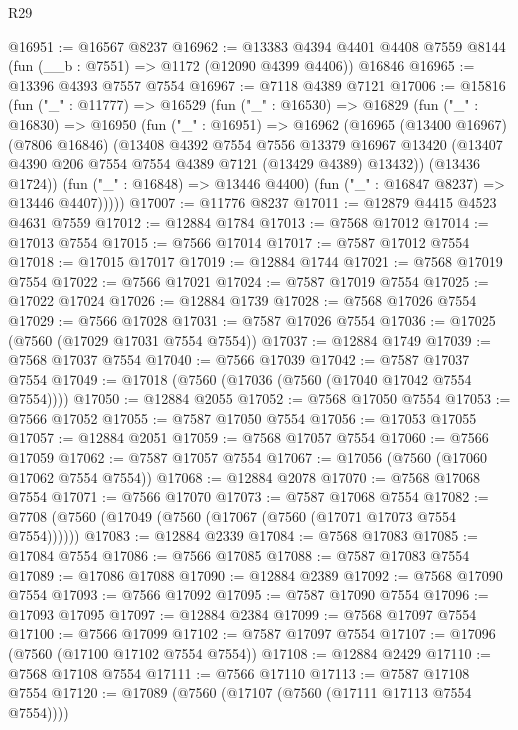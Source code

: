 \begin{lexlean}{R29}
\begin{coremodule}
@16951 := @16567 @8237
@16962 := @13383
    @4394
    @4401
    @4408
    @7559
    @8144
    (fun (__b : @7551) => @1172 (@12090 @4399 @4406))
    @16846
@16965 := @13396 @4393 @7557 @7554
@16967 := @7118 @4389 @7121
@17006 := @15816
    (fun ("_" : @11777) =>
    @16529
      (fun ("_" : @16530) =>
      @16829
        (fun ("_" : @16830) =>
        @16950
          (fun ("_" : @16951) =>
          @16962
            (@16965
              (@13400 @16967)
              (@7806 @16846)
              (@13408
                @4392
                @7554
                @7556
                @13379
                @16967
                @13420
                (@13407 @4390 @206 @7554 @7554 @4389 @7121 (@13429 @4389) @13432))
              (@13436 @1724))
            (fun ("_" : @16848) => @13446 @4400)
            (fun ("_" : @16847 @8237) => @13446 @4407)))))
@17007 := @11776 @8237
@17011 := @12879 @4415 @4523 @4631 @7559
@17012 := @12884 @1784
@17013 := @7568 @17012
@17014 := @17013 @7554
@17015 := @7566 @17014
@17017 := @7587 @17012 @7554
@17018 := @17015 @17017
@17019 := @12884 @1744
@17021 := @7568 @17019 @7554
@17022 := @7566 @17021
@17024 := @7587 @17019 @7554
@17025 := @17022 @17024
@17026 := @12884 @1739
@17028 := @7568 @17026 @7554
@17029 := @7566 @17028
@17031 := @7587 @17026 @7554
@17036 := @17025 (@7560 (@17029 @17031 @7554 @7554))
@17037 := @12884 @1749
@17039 := @7568 @17037 @7554
@17040 := @7566 @17039
@17042 := @7587 @17037 @7554
@17049 := @17018 (@7560 (@17036 (@7560 (@17040 @17042 @7554 @7554))))
@17050 := @12884 @2055
@17052 := @7568 @17050 @7554
@17053 := @7566 @17052
@17055 := @7587 @17050 @7554
@17056 := @17053 @17055
@17057 := @12884 @2051
@17059 := @7568 @17057 @7554
@17060 := @7566 @17059
@17062 := @7587 @17057 @7554
@17067 := @17056 (@7560 (@17060 @17062 @7554 @7554))
@17068 := @12884 @2078
@17070 := @7568 @17068 @7554
@17071 := @7566 @17070
@17073 := @7587 @17068 @7554
@17082 := @7708 (@7560 (@17049 (@7560 (@17067 (@7560 (@17071 @17073 @7554 @7554))))))
@17083 := @12884 @2339
@17084 := @7568 @17083
@17085 := @17084 @7554
@17086 := @7566 @17085
@17088 := @7587 @17083 @7554
@17089 := @17086 @17088
@17090 := @12884 @2389
@17092 := @7568 @17090 @7554
@17093 := @7566 @17092
@17095 := @7587 @17090 @7554
@17096 := @17093 @17095
@17097 := @12884 @2384
@17099 := @7568 @17097 @7554
@17100 := @7566 @17099
@17102 := @7587 @17097 @7554
@17107 := @17096 (@7560 (@17100 @17102 @7554 @7554))
@17108 := @12884 @2429
@17110 := @7568 @17108 @7554
@17111 := @7566 @17110
@17113 := @7587 @17108 @7554
@17120 := @17089 (@7560 (@17107 (@7560 (@17111 @17113 @7554 @7554))))

\end{coremodule}
\end{lexlean}
